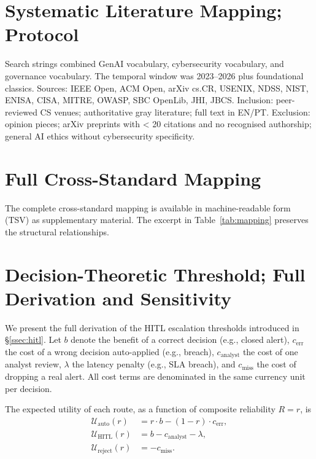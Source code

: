 \documentclass[preprint,12pt,authoryear]{elsarticle}
\begin{document}
{\sloppy


}

\appendix

\section{Systematic Literature Mapping; Protocol}
\label{app:slm}
Search strings combined GenAI vocabulary, cybersecurity vocabulary, and governance vocabulary. The temporal window was 2023--2026 plus foundational classics. Sources: IEEE Open, ACM Open, arXiv cs.CR, USENIX, NDSS, NIST, ENISA, CISA, MITRE, OWASP, SBC OpenLib, JHI, JBCS. Inclusion: peer-reviewed CS venues; authoritative gray literature; full text in EN/PT. Exclusion: opinion pieces; arXiv preprints with < 20 citations and no recognised authorship; general AI ethics without cybersecurity specificity.

\section{Full Cross-Standard Mapping}
\label{app:mapping}
The complete cross-standard mapping is available in machine-readable form (TSV) as supplementary material. The excerpt in Table~\ref{tab:mapping} preserves the structural relationships.

\section{Decision-Theoretic Threshold; Full Derivation and Sensitivity}
\label{app:threshold}
We present the full derivation of the HITL escalation thresholds introduced in §\ref{ssec:hitl}. Let $b$ denote the benefit of a correct decision (e.g., closed alert), $c_{\text{err}}$ the cost of a wrong decision auto-applied (e.g., breach), $c_{\text{analyst}}$ the cost of one analyst review, $\lambda$ the latency penalty (e.g., SLA breach), and $c_{\text{miss}}$ the cost of dropping a real alert. All cost terms are denominated in the same currency unit per decision.

The expected utility of each route, as a function of composite reliability $R = r$, is
\begin{align}
\mathcal{U}_{\text{auto}}(r) &= r \cdot b - (1 - r) \cdot c_{\text{err}}, \\
\mathcal{U}_{\text{HITL}}(r) &= b - c_{\text{analyst}} - \lambda, \\
\mathcal{U}_{\text{reject}}(r) &= - c_{\text{miss}}.
\end{align}
\end{document}
